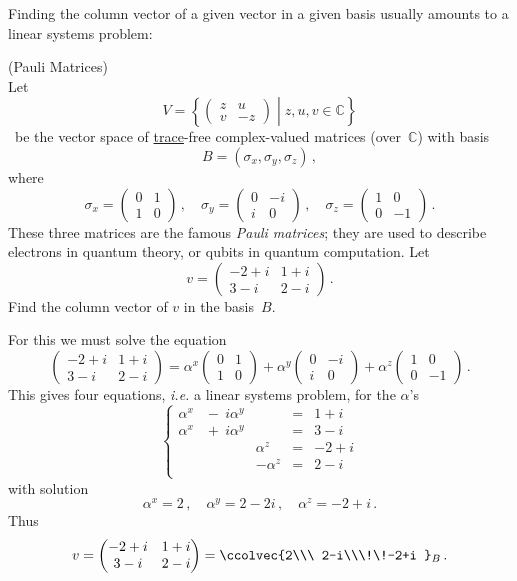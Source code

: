 Finding the column vector of a given vector in a given basis usually amounts to a linear systems problem:

\begin{example} (Pauli Matrices)\\
Let \[V=\left\{\begin{pmatrix}z&u\\v&-z\end{pmatrix}\middle| z,u,v\in{\mathbb C}\right\}\]\
be the vector space of \hyperlink{TRACE}{trace}-free complex-valued matrices (over~${\mathbb C}$) with basis
\[
B=(\sigma_x,\sigma_y,\sigma_z)\, ,
\] where
\[
\sigma_x=\begin{pmatrix}0&1\\1&0\end{pmatrix}\, ,\quad
\sigma_y=\begin{pmatrix}0&-i\\i&0\end{pmatrix}\, ,\quad
\sigma_z=\begin{pmatrix}1&0\\0&-1\end{pmatrix}\, .
\]
These three matrices are the famous {\itshape Pauli matrices}; they are used to describe electrons in quantum theory, or qubits in quantum computation.
Let 
\[
v=\begin{pmatrix}
-2+i&1+i\\3-i&2-i
\end{pmatrix}\, .
\]
Find the column vector of $v$ in the basis~$B$.

For this we must solve the equation
\[
\begin{pmatrix}
-2+i&1+i\\3-i&2-i
\end{pmatrix}
=\alpha^x \begin{pmatrix}0&1\\1&0\end{pmatrix}+\alpha^y
\begin{pmatrix}0&-i\\i&0\end{pmatrix}+\alpha^z
\begin{pmatrix}1&0\\0&-1\end{pmatrix}\, .
\]
This gives four equations, {\itshape i.e.} a linear systems problem, for the $\alpha$'s
\[
\left\{
\begin{array}{rrrrr}
\alpha^x&\!\!-\ i\alpha^y&&=&1+i\\
\alpha^x&\!\!+\ i\alpha^y&&=&3-i\\
&&\alpha^z&=&-2+i\\
&&-\alpha^z&=&2-i\\
\end{array}
\right.
\]
with solution
\[
\alpha^x=2\, ,\quad \alpha^y=2-2i\, ,\quad \alpha^z=-2+i\, .
\]
Thus
\[
v=\begin{pmatrix}
-2+i&1+i\\3-i&2-i
\end{pmatrix}=\ccolvec{2\\\ 2-i\\\!\!-2+i }_B\, .
\]
\end{example}

